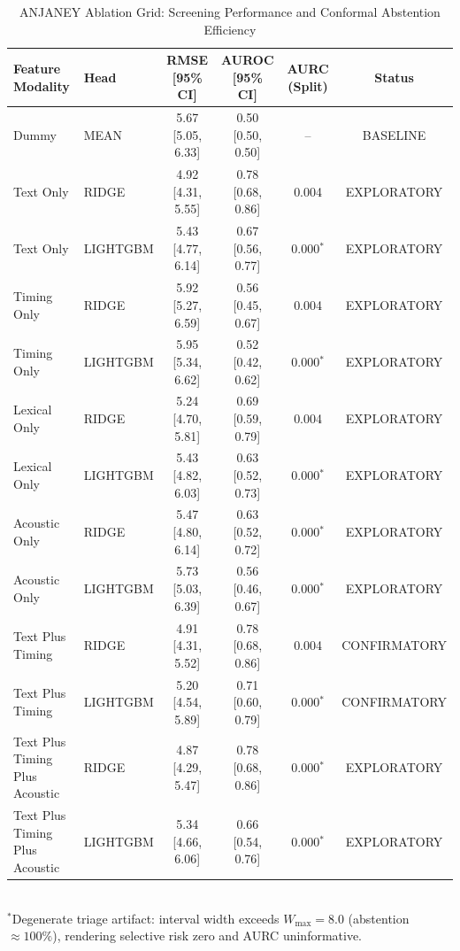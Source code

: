 \begin{table}[t]
\centering
\small
\caption{ANJANEY Ablation Grid: Screening Performance and Conformal Abstention Efficiency}
\label{tab:ablation_grid}
\begin{tabular}{llcccc}
\toprule
\textbf{Feature Modality} & \textbf{Head} & \textbf{RMSE [95\% CI]} & \textbf{AUROC [95\% CI]} & \textbf{AURC (Split)} & \textbf{Status} \\
\midrule
Dummy & MEAN & 5.67 [5.05, 6.33] & 0.50 [0.50, 0.50] & -- & BASELINE \\
Text Only & RIDGE & 4.92 [4.31, 5.55] & 0.78 [0.68, 0.86] & 0.004 & EXPLORATORY \\
Text Only & LIGHTGBM & 5.43 [4.77, 6.14] & 0.67 [0.56, 0.77] & 0.000$^*$ & EXPLORATORY \\
Timing Only & RIDGE & 5.92 [5.27, 6.59] & 0.56 [0.45, 0.67] & 0.004 & EXPLORATORY \\
Timing Only & LIGHTGBM & 5.95 [5.34, 6.62] & 0.52 [0.42, 0.62] & 0.000$^*$ & EXPLORATORY \\
Lexical Only & RIDGE & 5.24 [4.70, 5.81] & 0.69 [0.59, 0.79] & 0.004 & EXPLORATORY \\
Lexical Only & LIGHTGBM & 5.43 [4.82, 6.03] & 0.63 [0.52, 0.73] & 0.000$^*$ & EXPLORATORY \\
Acoustic Only & RIDGE & 5.47 [4.80, 6.14] & 0.63 [0.52, 0.72] & 0.000$^*$ & EXPLORATORY \\
Acoustic Only & LIGHTGBM & 5.73 [5.03, 6.39] & 0.56 [0.46, 0.67] & 0.000$^*$ & EXPLORATORY \\
Text Plus Timing & RIDGE & 4.91 [4.31, 5.52] & 0.78 [0.68, 0.86] & 0.004 & CONFIRMATORY \\
Text Plus Timing & LIGHTGBM & 5.20 [4.54, 5.89] & 0.71 [0.60, 0.79] & 0.000$^*$ & CONFIRMATORY \\
Text Plus Timing Plus Acoustic & RIDGE & 4.87 [4.29, 5.47] & 0.78 [0.68, 0.86] & 0.000$^*$ & EXPLORATORY \\
Text Plus Timing Plus Acoustic & LIGHTGBM & 5.34 [4.66, 6.06] & 0.66 [0.54, 0.76] & 0.000$^*$ & EXPLORATORY \\
\bottomrule
\end{tabular}
\\[2pt]
\footnotesize{$^*$Degenerate triage artifact: interval width exceeds $W_{\max}=8.0$ (abstention $\approx 100\%$), rendering selective risk zero and AURC uninformative.}
\end{table}
